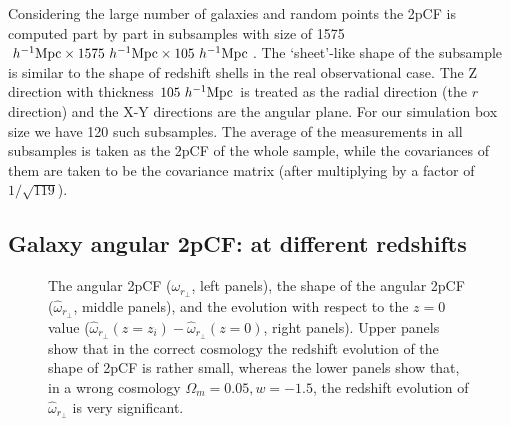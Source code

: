 \documentclass[iop]{emulateapj}
\begin{document}
Considering the large number of galaxies and random points the 2pCF is computed part by part in subsamples with 
size of 1575 $h^{-1}{\rm Mpc}\times 1575\ h^{-1}{\rm Mpc}\times 105\ h^{-1}{\rm Mpc}$.
The `sheet'-like shape of the subsample is similar to the shape of redshift shells in the real observational case.
The Z direction with thickness $105\ h^{-1}\rm Mpc$ is treated as the radial direction (the $r$ direction) 
and the X-Y directions %
are the angular plane.
For our simulation box size we have 120 such subsamples.
The average of the measurements in all subsamples is taken as the 2pCF of the whole sample,
while the covariances of them are taken to be the covariance matrix (after multiplying by a factor of $1/\sqrt{119}$).


\subsection{Galaxy angular 2pCF: at different redshifts}\label{sec_2pCF_diffz}


\begin{figure}
   \caption{\label{fig_diffz}
  The angular 2pCF ($\omega_{r_\perp}$, left panels), the shape of the angular 2pCF ($\hat{\omega}_{r_\perp}$, middle panels),
  and the evolution with respect to the $z=0$ value ($\hat{\omega}_{r_{\perp}}(z=z_i) - \hat{\omega}_{r_{\perp}}(z=0)$, right panels). 
  Upper panels show that in the correct cosmology the redshift evolution of the shape of 2pCF is rather small, 
  whereas the lower panels show that, in a wrong cosmology $\Omega_m = 0.05,w=-1.5$, the redshift evolution of $\hat{\omega}_{r_\perp}$ is very significant.
   }
\end{figure}
\end{document}
